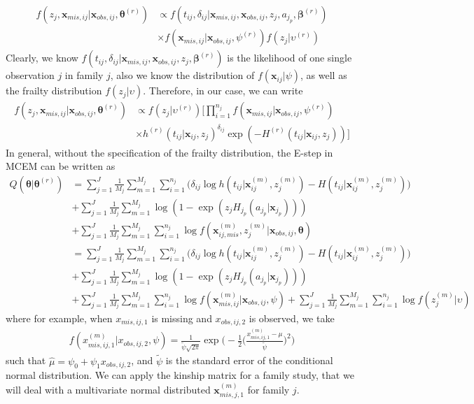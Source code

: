 \documentclass[preprint,12pt]{elsarticle}
\begin{document}
\begin{align} 
    f(z_j, \mathbf{x}_{mis,ij}|\mathbf{x}_{obs,ij}, \boldsymbol{\theta}^{(r)})&\propto f(t_{ij}, \delta_{ij}|\mathbf{x}_{mis,ij}, \mathbf{x}_{obs,ij}, z_j, a_{j_p}, \boldsymbol{\beta}^{(r)})\\
    &\times f(\mathbf{x}_{mis,ij}|\mathbf{x}_{obs,ij}, \psi^{(r)})f(z_j|\upsilon^{(r)})
\end{align}
Clearly, we know $f(t_{ij}, \delta_{ij}|\mathbf{x}_{mis,ij}, \mathbf{x}_{obs,ij}, z_j, \boldsymbol{\beta}^{(r)})$ is the likelihood of one single observation $j$ in family $j$, also we know the distribution of $f(\mathbf{x}_{ij}|\psi)$, as well as the frailty distribution $f(z_j|\upsilon)$. 
Therefore, in our case, we can write 
\begin{align} 
    f(z_j, \mathbf{x}_{mis,ij}|\mathbf{x}_{obs,ij}, \boldsymbol{\theta}^{(r)})&\propto f(z_j|\upsilon^{(r)})\Big [ \prod_{i=1}^{n_j} f(\mathbf{x}_{mis,ij}|\mathbf{x}_{obs,ij}, \psi^{(r)})\\ 
    &\times h^{(r)}(t_{ij}|\mathbf{x}_{ij}, z_j)^{\delta_{ij}}\exp (-H^{(r)}(t_{ij}|\mathbf{x}_{ij}, z_j))\Big ]
\end{align}
In general, without the specification of the frailty distribution, the E-step in MCEM can be written as 
\begin{align} 
    Q(\boldsymbol{\theta}|\boldsymbol{\theta}^{(r)})&=\sum_{j=1}^J \frac{1}{M_j}\sum_{m=1}^{M_j}\sum_{i=1}^{n_j} \Big ( \delta_{ij}\log h(t_{ij}|\mathbf{x}_{ij}^{(m)}, z_j^{(m)}) - H(t_{ij}|\mathbf{x}_{ij}^{(m)}, z_j^{(m)})\Big )\\
    &+\sum_{j=1}^J\frac{1}{M_j}\sum_{m=1}^{M_j}\log(1- \exp(z_j H_{j_p}(a_{j_p}|\mathbf{x}_{j_p})))\\
    &+\sum_{j=1}^J\frac{1}{M_j}\sum_{m=1}^{M_j}\sum_{i=1}^{n_j}\log f(\mathbf{x}_{ij,mis}^{(m)}, z_j^{(m)}|\mathbf{x}_{obs,ij}, \boldsymbol{\theta})\\
    &=\sum_{j=1}^J \frac{1}{M_j}\sum_{m=1}^{M_j}\sum_{i=1}^{n_j} \Big ( \delta_{ij}\log h(t_{ij}|\mathbf{x}_{ij}^{(m)}, z_j^{(m)}) - H(t_{ij}|\mathbf{x}_{ij}^{(m)}, z_j^{(m)})\Big )\\
    &+\sum_{j=1}^J\frac{1}{M_j}\sum_{m=1}^{M_j}\log(1- \exp(z_j H_{j_p}(a_{j_p}|\mathbf{x}_{j_p})))\\
    &+\sum_{j=1}^J\frac{1}{M_j}\sum_{m=1}^{M_j}\sum_{i=1}^{n_j}\log f(\mathbf{x}_{mis,ij}^{(m)}|\mathbf{x}_{obs,ij}, \psi)+\sum_{j=1}^J\frac{1}{M_j}\sum_{m=1}^{M_j}\sum_{i=1}^{n_j}\log f(z_j^{(m)}|\upsilon)
\end{align} 
where for example, when $x_{mis,ij,1}$ is missing and $x_{obs,ij,2}$ is observed, we take
\begin{align} 
    f(x_{mis,ij,1}^{(m)}|x_{obs,ij,2}, \psi)=\frac{1}{\tilde{\psi}\sqrt{2\pi}}\exp \Big (-\frac{1}{2}\Big (\frac{x_{mis,ij,1}^{(m)} - \mu}{\tilde{\psi}}\Big )^2\Big )
\end{align}
such that $\hat{\mu}=\psi_0 + \psi_1 x_{obs,ij,2}$, and $\tilde{\psi}$ is the standard error of the conditional normal distribution.
We can apply the kinship matrix for a family study, that we will deal with a multivariate normal distributed $\mathbf{x}_{mis,j,1}^{(m)}$ for family $j$. 
\end{document}
